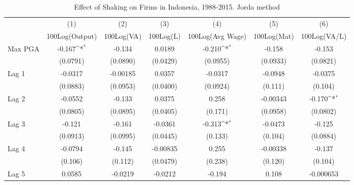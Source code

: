 \begin{table}[htbp]\centering
\def\sym#1{\ifmmode^{#1}\else\(^{#1}\)\fi}
\caption{Effect of Shaking on Firms in Indonesia, 1988-2015. Jorda method}
\begin{tabular}{l*{6}{c}}
\toprule
                &\multicolumn{1}{c}{(1)}&\multicolumn{1}{c}{(2)}&\multicolumn{1}{c}{(3)}&\multicolumn{1}{c}{(4)}&\multicolumn{1}{c}{(5)}&\multicolumn{1}{c}{(6)}\\
                &\multicolumn{1}{c}{100Log(Output)}&\multicolumn{1}{c}{100Log(VA)}&\multicolumn{1}{c}{100Log(L)}&\multicolumn{1}{c}{100Log(Avg Wage)}&\multicolumn{1}{c}{100Log(Mat)}&\multicolumn{1}{c}{100Log(VA/L)}\\
\midrule
Max PGA         &   -0.167\sym{*}  &   -0.134         &   0.0189         &   -0.210\sym{*}  &   -0.158         &   -0.153         \\
                & (0.0791)         & (0.0890)         & (0.0429)         & (0.0955)         & (0.0933)         & (0.0821)         \\
\addlinespace
Lag 1           &  -0.0317         & -0.00185         &   0.0357         &  -0.0317         &  -0.0948         &  -0.0375         \\
                & (0.0883)         & (0.0953)         & (0.0400)         & (0.0924)         &  (0.111)         &  (0.104)         \\
\addlinespace
Lag 2           &  -0.0552         &   -0.133         &   0.0375         &    0.258         & -0.00343         &   -0.170\sym{*}  \\
                & (0.0805)         & (0.0895)         & (0.0405)         &  (0.171)         & (0.0958)         & (0.0802)         \\
\addlinespace
Lag 3           &   -0.121         &   -0.161         &  -0.0361         &   -0.313\sym{*}  &  -0.0473         &   -0.125         \\
                & (0.0913)         & (0.0995)         & (0.0445)         &  (0.133)         &  (0.104)         & (0.0884)         \\
\addlinespace
Lag 4           &  -0.0794         &   -0.145         & -0.00835         &    0.255         & -0.00338         &   -0.137         \\
                &  (0.106)         &  (0.112)         & (0.0479)         &  (0.238)         &  (0.120)         &  (0.104)         \\
\addlinespace
Lag 5           &   0.0585         &  -0.0219         &  -0.0212         &   -0.194         &    0.108         &-0.000653         \\

\end{tabular}
\end{table}
